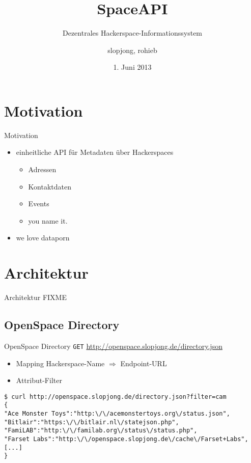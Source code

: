 \documentclass{beamer}
\author{slopjong, rohieb}
\title{SpaceAPI}
\subtitle{Dezentrales Hackerspace-Informationssystem}
\institute{GPN13}
\date{1. Juni 2013}
\begin{document}
\begin{frame}
	\maketitle
\end{frame}

\section{Motivation}
\begin{frame}{Motivation}
\begin{itemize}
	\item einheitliche API für Metadaten über Hackerspaces
	\pause
	\begin{itemize}
		\item Adressen
		\item Kontaktdaten
		\item Events
		\item you name it.
	\end{itemize}
	\pause
	\item we love dataporn
\end{itemize}
\end{frame}

\section{Architektur}
\begin{frame}{Architektur}
FIXME
\end{frame}

\subsection{OpenSpace Directory}
\begin{frame}[fragile]{OpenSpace Directory}
\texttt{GET} \url{http://openspace.slopjong.de/directory.json}
\begin{itemize}
	\item Mapping Hackerspace-Name $\Rightarrow$ Endpoint-URL
	\item Attribut-Filter
\end{itemize}

\begin{lstlisting}
$ curl http://openspace.slopjong.de/directory.json?filter=cam
{
"Ace Monster Toys":"http:\/\/acemonstertoys.org\/status.json",
"Bitlair":"https:\/\/bitlair.nl\/statejson.php",
"FamiLAB":"http:\/\/familab.org\/status\/status.php",
"Farset Labs":"http:\/\/openspace.slopjong.de\/cache\/Farset+Labs",
[...]
}
\end{lstlisting}
\end{frame}
\end{document}

